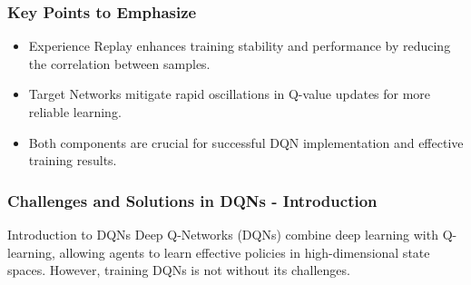 \documentclass[aspectratio=169]{beamer}
\begin{document}
\begin{frame}[fragile]
    \frametitle{Key Points to Emphasize}
    \begin{itemize}
        \item Experience Replay enhances training stability and performance by reducing the correlation between samples.
        \item Target Networks mitigate rapid oscillations in Q-value updates for more reliable learning.
        \item Both components are crucial for successful DQN implementation and effective training results.
    \end{itemize}
\end{frame}

\begin{frame}[fragile]
  \frametitle{Challenges and Solutions in DQNs - Introduction}
  \begin{block}{Introduction to DQNs}
    Deep Q-Networks (DQNs) combine deep learning with Q-learning, allowing agents to learn effective policies in high-dimensional state spaces. However, training DQNs is not without its challenges.
  \end{block}
\end{frame}
\end{document}
